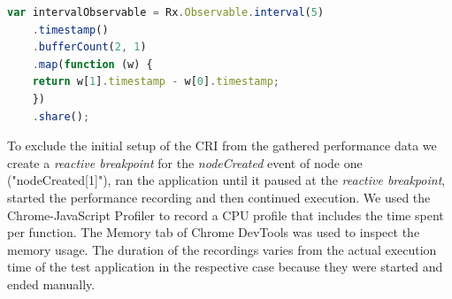 	\begin{lstlisting}[language=JavaScript, caption={Example of RxJS code.},label={lst:performanceTestExtract}]
	var intervalObservable = Rx.Observable.interval(5)
	.timestamp()
	.bufferCount(2, 1)
	.map(function (w) {
	return w[1].timestamp - w[0].timestamp;
	})
	.share();	
	\end{lstlisting}

	To exclude the initial setup of the CRI from the gathered performance data we create a \emph{reactive breakpoint} for the \emph{nodeCreated} event of node one ("nodeCreated[1]"), ran the application until it paused at the \emph{reactive breakpoint}, started the performance recording and then continued execution. We used the Chrome-JavaScript Profiler to record a CPU profile that includes the time spent per function. The Memory tab of Chrome DevTools was used to inspect the memory usage. The duration of the recordings varies from the actual execution time of the test application in the respective case because they were started and ended manually.\\
	
